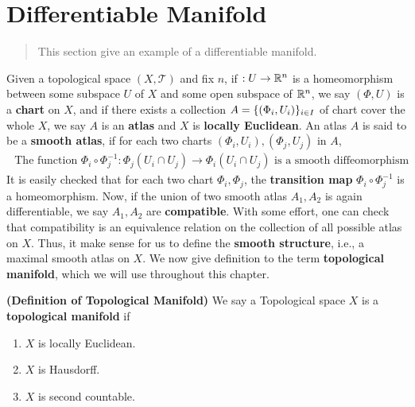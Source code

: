 \documentclass{report}
\begin{document}
\section{Differentiable Manifold}
\begin{abstract}
This section give an example of a differentiable manifold.
\end{abstract}
\begin{mdframed}
Given a topological space $(X,\mathscr{T })$ and fix $n$, if $:U\rightarrow \mathbb{R}^n$ is a homeomorphism between some subspace $U$ of $X$ and some open subspace of $\mathbb{R}^n$, we say $(\Phi,U)$ is a \textbf{chart} on $X$, and if there exists a collection $A=\{ (\Phi_i, U_i) \}_{i \in I}$ of chart cover the whole $X$, we say $A$ is an  \textbf{atlas} and  $X$ is  \textbf{locally Euclidean}. An atlas $A$ is said to be a \textbf{smooth atlas}, if for each two charts $(\Phi_i,U_i),(\Phi_j,U_j)$ in $A$, 
\begin{align*}
\text{ The function }\Phi_i\circ \Phi_j^{-1}:\Phi_j(U_i\cap U_j)\to \Phi_i(U_i\cap U_j)\text{ is a smooth diffeomorphism }
\end{align*}
It is easily checked that for each two chart $\Phi_i,\Phi_j$, the \textbf{transition map} $\Phi_i\circ \Phi_j^{-1}$ is a homeomorphism. Now, if the union of two smooth atlas $A_1,A_2$ is again differentiable, we say $A_1,A_2$ are \textbf{compatible}. With some effort, one can check that compatibility is an equivalence relation on the collection of all possible atlas on $X$. Thus, it make sense for us to define the \textbf{smooth structure}, i.e., a maximal smooth atlas on $X$. We now give definition to the term \textbf{topological manifold}, which we will use throughout this chapter.  
\end{mdframed}
\begin{definition}
\textbf{(Definition of Topological Manifold)} We say a Topological space $X$ is a \textbf{topological manifold} if 
\begin{enumerate}[label=(\alph*)]
  \item $X$ is locally Euclidean. 
  \item $X$ is Hausdorff. 
  \item $X$ is second countable.
\end{enumerate}
\end{definition}
\end{document}
